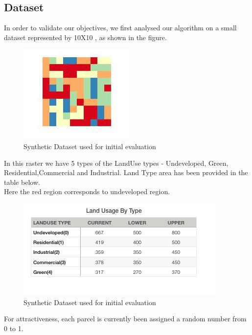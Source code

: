 \documentclass[12pt]{article} %
\begin{document}
\subsection{Dataset}
In order to validate our objectives, we first analysed our algorithm on a small dataset represented by 10X10  , as shown in the figure.
\begin{figure}[h]
\begin{center}
\includegraphics[width=3.in]{orig.png}
\caption{Synthetic Dataset used for initial evaluation}
\end{center}
\end{figure}

In this raster we have 5 types of the LandUse types - Undeveloped, Green, Residential,Commercial and Industrial. Land Type area has been provided in the table below.\\
Here the red region corresponds to undeveloped region.\\
\begin{figure}[h]
\begin{center}
\includegraphics[width=4.in]{areas.png}
\caption{Synthetic Dataset used for initial evaluation}
\end{center}
\end{figure}

For attractiveness, each parcel is currently been assigned a random number from 0 to 1. \\
\end{document}
